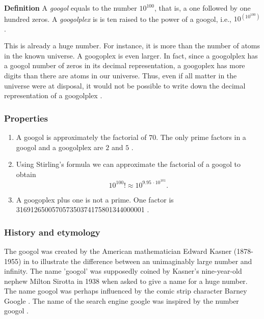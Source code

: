 \documentclass{article}
\begin{document}
{\bf Definition}
A \emph{googol} equals to the number $10^{100}$, that is, a one followed by
one hundred zeros.
A \emph{googolplex} is
is  ten raised to the power of a googol, i.e., $10^{(10^{100})}$.

This is already a huge number. For instance,
it is more than the number of atoms in the known universe.
A googoplex is even larger. In fact, since a googolplex has 
a googol number of zeros in its decimal
representation, 
a googoplex has more digits than there are atoms in our universe. 
Thus, even if all matter in the universe were at disposal,
it would not be possible to write down the decimal representatio{n} of
a googolplex \cite{wikigoogol}.

\subsubsection*{Properties}
\begin{enumerate}
\item
A googol is approximately the factorial of $70$.
The only prime factors in a googol and a googolplex are $2$ and $5$ \cite{wikigoogol}.
\item Using Stirling's formula  we can approximate the factorial of  a googol to obtain
$$ 
  10^{100}! \approx 10^{9.95\, \cdot 10^{101}}.$$
\item A googoplex plus one is not a prime. One factor is 316912650057057350374175801344000001 \cite{mrob}.
\end{enumerate}

\subsubsection*{History and etymology}
The googol was created by the American mathematician Edward Kasner (1878-1955) \cite{wikikasner}
in \cite{kasner} to  illustrate the difference between an
 unimaginably large number and infinity.
The name 'googol' was supposedly coined by Kasner's
nine-year-old nephew Milton Sirotta in 1938 when asked to give a name for a huge number.
The name googol was perhaps influenced by
the comic strip character Barney Google \cite{wikigoogol, harper}.
The name of the search engine google was inspired by the number 
googol \cite{google}.
\end{document}
